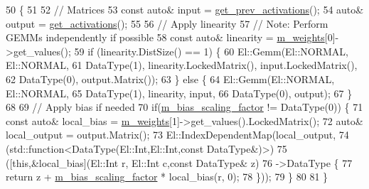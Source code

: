 \begin{DoxyCode}
50                                                                       \{
51 
52   \textcolor{comment}{// Matrices}
53   \textcolor{keyword}{const} \textcolor{keyword}{auto}& input = \hyperlink{classlbann_1_1Layer_a45853df73a2e72bfaa774665a0f37ed7}{get\_prev\_activations}();
54   \textcolor{keyword}{auto}& output = \hyperlink{classlbann_1_1Layer_a1134b1a4385af199d7272c5aa827fa99}{get\_activations}();
55 
56   \textcolor{comment}{// Apply linearity}
57   \textcolor{comment}{// Note: Perform GEMMs independently if possible}
58   \textcolor{keyword}{const} \textcolor{keyword}{auto}& linearity = \hyperlink{classlbann_1_1Layer_a7954e30fbf9100a6ba4b56d02767a469}{m\_weights}[0]->get\_values();
59   \textcolor{keywordflow}{if} (linearity.DistSize() == 1) \{
60     El::Gemm(El::NORMAL, El::NORMAL,
61              DataType(1), linearity.LockedMatrix(), input.LockedMatrix(),
62              DataType(0), output.Matrix());
63   \} \textcolor{keywordflow}{else} \{
64     El::Gemm(El::NORMAL, El::NORMAL,
65              DataType(1), linearity, input,
66              DataType(0), output);
67   \}
68 
69   \textcolor{comment}{// Apply bias if needed}
70   \textcolor{keywordflow}{if}(\hyperlink{classlbann_1_1fully__connected__layer_ae02eaffd5528bf572883f8b06d1b40c0}{m\_bias\_scaling\_factor} != DataType(0)) \{
71     \textcolor{keyword}{const} \textcolor{keyword}{auto}& local\_bias = \hyperlink{classlbann_1_1Layer_a7954e30fbf9100a6ba4b56d02767a469}{m\_weights}[1]->get\_values().LockedMatrix();
72     \textcolor{keyword}{auto}& local\_output = output.Matrix();
73     El::IndexDependentMap(local\_output,
74                           (std::function<DataType(El::Int,El::Int,\textcolor{keyword}{const} DataType&)>)
75                           ([\textcolor{keyword}{this},&local\_bias](El::Int r, El::Int c,\textcolor{keyword}{const} DataType& z)
76                            ->DataType \{
77                             \textcolor{keywordflow}{return} z + \hyperlink{classlbann_1_1fully__connected__layer_ae02eaffd5528bf572883f8b06d1b40c0}{m\_bias\_scaling\_factor} * local\_bias(r, 0);
78                           \}));
79   \}
80 
81 \}
\end{DoxyCode}
\mbox{\label{classlbann_1_1fully__connected__layer_a97243a5aa3474ff70c6f2d7f7e995e65}} 
